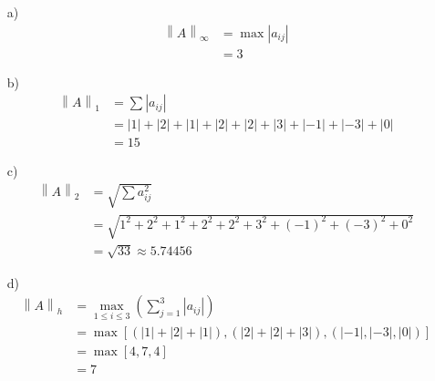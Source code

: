 \documentclass[12pt]{article}
\newcommand{\norm}[1]{\left\lVert#1\right\rVert}
\begin{document}
\begin{enumerate}
	\item[a)] 
	\begin{align*}
		\norm{A}_{\infty} &= \max |a_{ij}|\\
		&= 3
	\end{align*}
	\item[b)]
	\begin{align*}
		\norm{A}_{1} &= \sum |a_{ij}|\\
		&= |1| + |2| + |1| + |2| + |2| + |3| + |-1| + |-3| + |0|\\
		&= 15
	\end{align*}
	\item[c)]
	\begin{align*}
		\norm{A}_{2} &= \sqrt{\sum a_{ij}^2}\\
		&= \sqrt{1^2 + 2^2 + 1^2 + 2^2 + 2^2 + 3^2 + (-1)^2 + (-3)^2 + 0^2}\\
		&= \sqrt{33} \approx 5.74456
	\end{align*}
	\item[d)]
	\begin{align*}
		\norm{A}_{h} &= \max_{1 \leq i \leq 3} (\sum_{j=1}^{3} |a_{ij}|)\\
		&= \max [(|1| + |2| + |1|), (|2| + |2| + |3|), (|-1|, |-3|, |0|)]\\
		&= \max [4, 7, 4]\\
		&= 7
	\end{align*}
\end{enumerate}
\end{document}
